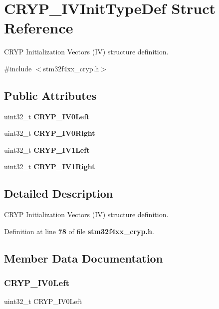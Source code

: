 \section{C\+R\+Y\+P\+\_\+\+I\+V\+Init\+Type\+Def Struct Reference}
\label{structCRYP__IVInitTypeDef}


C\+R\+YP Initialization Vectors (IV) structure definition.  




{\ttfamily \#include $<$stm32f4xx\+\_\+cryp.\+h$>$}

\subsection*{Public Attributes}
\begin{DoxyCompactItemize}
\item 
uint32\+\_\+t \textbf{ C\+R\+Y\+P\+\_\+\+I\+V0\+Left}
\item 
uint32\+\_\+t \textbf{ C\+R\+Y\+P\+\_\+\+I\+V0\+Right}
\item 
uint32\+\_\+t \textbf{ C\+R\+Y\+P\+\_\+\+I\+V1\+Left}
\item 
uint32\+\_\+t \textbf{ C\+R\+Y\+P\+\_\+\+I\+V1\+Right}
\end{DoxyCompactItemize}


\subsection{Detailed Description}
C\+R\+YP Initialization Vectors (IV) structure definition. 

Definition at line \textbf{ 78} of file \textbf{ stm32f4xx\+\_\+cryp.\+h}.



\subsection{Member Data Documentation}
\mbox{\label{structCRYP__IVInitTypeDef_a046a2af08ebf902cb03306771889c91f}} 
\subsubsection{C\+R\+Y\+P\+\_\+\+I\+V0\+Left}
{\footnotesize\ttfamily uint32\+\_\+t C\+R\+Y\+P\+\_\+\+I\+V0\+Left}

